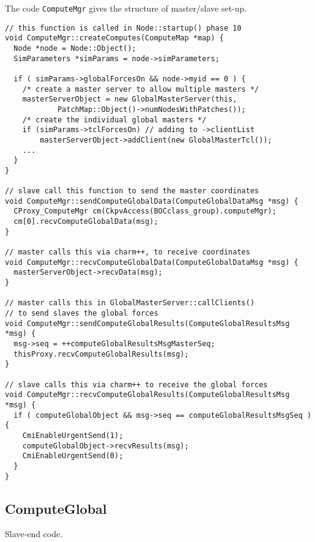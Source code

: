 \documentclass{article}
\begin{document}
The code \texttt{ComputeMgr}
gives the structure of master/slave set-up.
%
\begin{lstlisting}
// this function is called in Node::startup() phase 10
void ComputeMgr::createComputes(ComputeMap *map) {
  Node *node = Node::Object();
  SimParameters *simParams = node->simParameters;

  if ( simParams->globalForcesOn && node->myid == 0 ) {
    /* create a master server to allow multiple masters */
    masterServerObject = new GlobalMasterServer(this,
            PatchMap::Object()->numNodesWithPatches());
    /* create the individual global masters */
    if (simParams->tclForcesOn) // adding to ->clientList
        masterServerObject->addClient(new GlobalMasterTcl());
    ...
  }
}

// slave call this function to send the master coordinates
void ComputeMgr::sendComputeGlobalData(ComputeGlobalDataMsg *msg) {
  CProxy_ComputeMgr cm(CkpvAccess(BOCclass_group).computeMgr);
  cm[0].recvComputeGlobalData(msg);
}

// master calls this via charm++, to receive coordinates
void ComputeMgr::recvComputeGlobalData(ComputeGlobalDataMsg *msg) {
  masterServerObject->recvData(msg);
}

// master calls this in GlobalMasterServer::callClients()
// to send slaves the global forces
void ComputeMgr::sendComputeGlobalResults(ComputeGlobalResultsMsg *msg) {
  msg->seq = ++computeGlobalResultsMsgMasterSeq;
  thisProxy.recvComputeGlobalResults(msg);
}

// slave calls this via charm++ to receive the global forces
void ComputeMgr::recvComputeGlobalResults(ComputeGlobalResultsMsg *msg) {
  if ( computeGlobalObject && msg->seq == computeGlobalResultsMsgSeq ) {
    CmiEnableUrgentSend(1);
    computeGlobalObject->recvResults(msg);
    CmiEnableUrgentSend(0);
  }
}
\end{lstlisting}


\subsection{ComputeGlobal}

Slave-end code.
\end{document}
